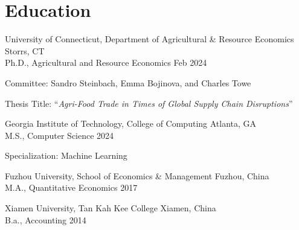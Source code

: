 \documentclass[10.5 pt,letterpaper]{article}
\renewenvironment{itemize}{
	\begin{list}{}{
			\setlength{\leftmargin}{1.5em}
		}
	}{
	\end{list}
}
\begin{document}
	\section*{\textbf{ Education}}
	\begin{itemize}
		\item[-]  University of Connecticut, Department of Agricultural \& Resource Economics  \hfill Storrs, CT \\
	Ph.D., Agricultural and Resource Economics  \hfill  Feb  2024  
	
			
			Committee:	 	 Sandro Steinbach,	Emma Bojinova, and Charles Towe 
			
			Thesis Title: ``\textit{Agri-Food Trade in Times of Global Supply Chain Disruptions}''
 
		 
	
		 \item[-]    Georgia Institute of Technology, College of  Computing \hfill   Atlanta, GA   \\ 
		 M.S., Computer Science  \hfill      2024  
 
	Specialization: Machine Learning
 
		\item[-]  Fuzhou University, School of Economics \& Management \hfill Fuzhou, China \\ 
		M.A.,   Quantitative Economics  \hfill    2017
		
 
		\item[-]  Xiamen University, Tan Kah Kee College    \hfill  Xiamen, China \\
	B.a.,  Accounting \hfill    2014
 
	\end{itemize}
	
 
 
\end{document}
